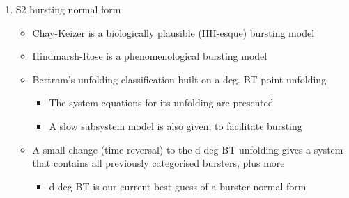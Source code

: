 \documentclass[11pt]{article}
\begin{document}
\begin{enumerate}
\item S2 bursting normal form
\label{sec:orge323494}
\begin{itemize}
\item Chay-Keizer is a biologically plausible (HH-esque) bursting model
\item Hindmarsh-Rose is a phenomenological bursting model
\item Bertram's unfolding classification built on a deg. BT point unfolding
\begin{itemize}
\item The system equations for its unfolding are presented
\item A slow subsystem model is also given, to facilitate bursting
\end{itemize}
\item A small change (time-reversal) to the d-deg-BT unfolding gives a system that contains all previously categorised bursters, plus more
\begin{itemize}
\item d-deg-BT is our current best guess of a burster normal form
\end{itemize}
\end{itemize}


\end{enumerate}
\end{document}
